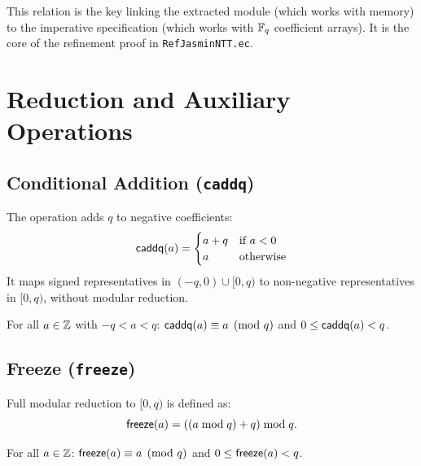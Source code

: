 This relation is the key linking the extracted \jasmin{} module (which works
with  memory) to the imperative specification (which works
with \(\mathbb{F}_q\) coefficient arrays).  It is the core of the refinement proof in
\texttt{RefJasminNTT.ec}.

\section{Reduction and Auxiliary Operations}

\subsection{Conditional Addition (\texttt{caddq})}

The  operation adds $q$ to negative coefficients:
\[
  \mathsf{caddq}(a) = \begin{cases} a + q & \text{if } a < 0 \\ a & \text{otherwise} \end{cases}
\]
It maps signed representatives in $(-q, 0) \cup [0, q)$ to non-negative
representatives in $[0, q)$, without modular reduction.

\begin{lemma}
  For all $a \in \mathbb{Z}$ with $-q < a < q$:
  $\mathsf{caddq}(a) \equiv a \pmod{q}$ and $0 \le \mathsf{caddq}(a) < q$.
\label{lem:caddq}
\end{lemma}

\subsection{Freeze (\texttt{freeze})}

Full modular reduction to $[0, q)$ is defined as:
\[
  \mathsf{freeze}(a) = ((a \bmod q) + q) \bmod q.
\]
\begin{lemma}
  For all $a \in \mathbb{Z}$:
  $\mathsf{freeze}(a) \equiv a \pmod{q}$ and $0 \le \mathsf{freeze}(a) < q$.
\label{lem:freeze}
\end{lemma}
